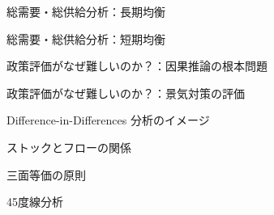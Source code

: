 \documentclass[
  dvipdfmx,               %
  t,                      %
  10pt
]{beamer}
\begin{document}
\begin{frame}{総需要・総供給分析：長期均衡}
  \begin{center}
    \scalebox{0.8}{}
  \end{center}
\end{frame}

\begin{frame}{総需要・総供給分析：短期均衡}
  \begin{center}
    \scalebox{0.8}{}
  \end{center}
\end{frame}

\begin{frame}{政策評価がなぜ難しいのか？：因果推論の根本問題}
  \begin{center}
    \scalebox{0.8}{}
  \end{center}
\end{frame}

\begin{frame}{政策評価がなぜ難しいのか？：景気対策の評価}
  \begin{center}
    \scalebox{0.8}{}
  \end{center}
\end{frame}

\begin{frame}{Difference-in-Differences 分析のイメージ}
  \begin{center}
    \scalebox{0.8}{}
  \end{center}
\end{frame}

\begin{frame}{ストックとフローの関係}
  \begin{center}
    \scalebox{0.6}{}
  \end{center}
\end{frame}

\begin{frame}{三面等価の原則}
  \begin{center}
    \scalebox{0.5}{}
  \end{center}
\end{frame}

\begin{frame}{45度線分析}
  \begin{center}
    
  \end{center}
\end{frame}
\end{document}
